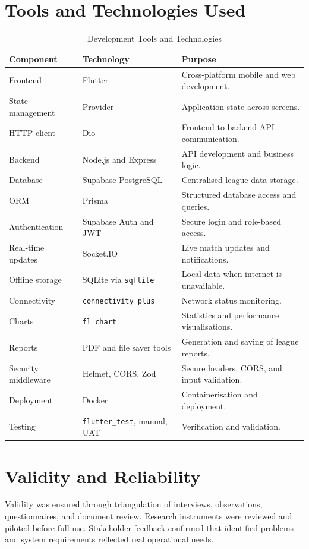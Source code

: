 \documentclass[12pt,a4paper]{report}
\begin{document}
\section{Tools and Technologies Used}
\begin{table}[H]
\centering
\caption{Development Tools and Technologies}
\begin{tabular}{p{4cm}p{4.5cm}p{5.5cm}}
\toprule
\textbf{Component} & \textbf{Technology} & \textbf{Purpose}\\
\midrule
Frontend & Flutter & Cross-platform mobile and web development.\\
State management & Provider & Application state across screens.\\
HTTP client & Dio & Frontend-to-backend API communication.\\
Backend & Node.js and Express & API development and business logic.\\
Database & Supabase PostgreSQL & Centralised league data storage.\\
ORM & Prisma & Structured database access and queries.\\
Authentication & Supabase Auth and JWT & Secure login and role-based access.\\
Real-time updates & Socket.IO & Live match updates and notifications.\\
Offline storage & SQLite via \texttt{sqflite} & Local data when internet is unavailable.\\
Connectivity & \texttt{connectivity\_plus} & Network status monitoring.\\
Charts & \texttt{fl\_chart} & Statistics and performance visualisations.\\
Reports & PDF and file saver tools & Generation and saving of league reports.\\
Security middleware & Helmet, CORS, Zod & Secure headers, CORS, and input validation.\\
Deployment & Docker & Containerisation and deployment.\\
Testing & \texttt{flutter\_test}, manual, UAT & Verification and validation.\\
\bottomrule
\end{tabular}
\end{table}

\section{Validity and Reliability}
Validity was ensured through triangulation of interviews, observations, questionnaires, and
document review. Research instruments were reviewed and piloted before full use. Stakeholder
feedback confirmed that identified problems and system requirements reflected real operational needs.
\end{document}
